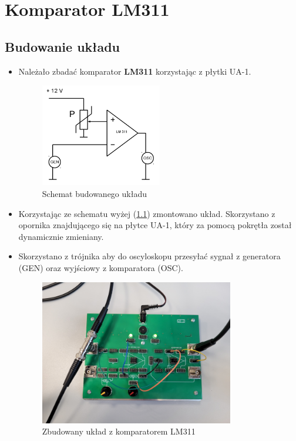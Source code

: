 \chapter{Komparator LM311}

\section{Budowanie układu}

\begin{itemize}
    \item Należało zbadać komparator \textbf{LM311} korzystając z płytki UA-1.
        \begin{figure}[H]
            \centering
            \includegraphics[width=0.5\textwidth]{img/schemes/1.png}
            \caption{Schemat budowanego układu}
            \label{komparator:schemat}
        \end{figure}
    \item Korzystając ze schematu wyżej (\ref{komparator:schemat}) zmontowano układ. Skorzystano z opornika znajdującego się na płytce UA-1, który za pomocą pokrętła został dynamicznie zmieniany.
    \item Skorzystano z trójnika aby do oscyloskopu przesyłać sygnał z generatora (GEN) oraz wyjściowy z komparatora (OSC).
        \begin{figure}[H]
            \centering
            \includegraphics[width=0.8\textwidth]{img/1/20220608_085306_scaled.png}
            \caption{Zbudowany układ z komparatorem LM311}
            \label{komparator:zbudowany}
        \end{figure}
\end{itemize}

